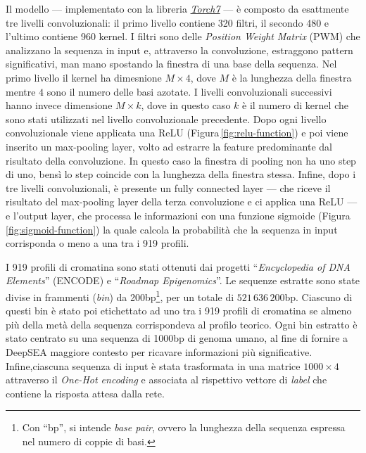 Il modello — implementato con la libreria \href{https://github.com/torch/torch7}{\textsl{Torch7}} — è composto da esattmente tre livelli convoluzionali: il primo livello contiene 320 filtri, il secondo 480 e l'ultimo contiene 960 kernel. I filtri sono delle \textit{Position Weight Matrix} (\acs{PWM}) che analizzano la sequenza in input e, attraverso la convoluzione, estraggono pattern significativi, man mano spostando la finestra di una base della sequenza. Nel primo livello il kernel ha dimesnione $M\times 4$, dove $M$ è la lunghezza della finestra mentre $4$ sono il numero delle basi azotate. I livelli convoluzionali successivi hanno invece dimensione $M\times k$, dove in questo caso $k$ è il numero di kernel che sono stati utilizzati nel livello convoluzionale precedente. Dopo ogni livello convoluzionale viene applicata una \acs{ReLU} (Figura\,\ref{fig:relu-function}) e poi viene inserito un max-pooling layer, volto ad estrarre la feature predominante dal risultato della convoluzione. In questo caso la finestra di pooling non ha uno step di uno, bensì lo step coincide con la lunghezza della finestra stessa. Infine, dopo i tre livelli convoluzionali, è presente un fully connected layer — che riceve il risultato del max-pooling layer della terza convoluzione e ci applica una \acs{ReLU} — e l'output layer, che processa le informazioni con una funzione sigmoide (Figura\,\ref{fig:sigmoid-function}) la quale calcola la probabilità che la sequenza in input corrisponda o meno a una tra i 919 profili.

I 919 profili di cromatina sono stati ottenuti dai progetti ``\textit{Encyclopedia of \acs{DNA} Elements}'' (\acs{ENCODE}) e ``\textit{Roadmap Epigenomics}''. Le sequenze estratte sono state divise in frammenti (\textit{bin}) da 200bp\footnote{Con ``bp'', si intende \textit{base pair}, ovvero la lunghezza della sequenza espressa nel numero di coppie di basi.}, per un totale di $521\,636\,200$bp. Ciascuno di questi bin è stato poi etichettato ad uno tra i 919 profili di cromatina se almeno più della metà della sequenza corrispondeva al profilo teorico. Ogni bin estratto è stato centrato su una sequenza di 1000bp di genoma umano, al fine di fornire a DeepSEA maggiore contesto per ricavare informazioni più significative. Infine,ciascuna sequenza di input è stata trasformata in una matrice $1000\times 4$ attraverso il \textit{One-Hot encoding} e associata al rispettivo vettore di \textit{label} che contiene la risposta attesa dalla rete. 

